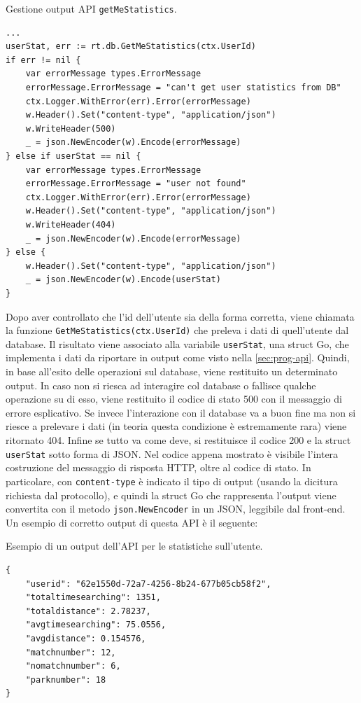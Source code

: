 \documentclass[italian, Lau, oneside, nodefaultfont, noexaminfo]{sapthesis}
\begin{document}
\begin{listing}[H]
\caption{Gestione output API \texttt{getMeStatistics}.}
\begin{verbatim}
...
userStat, err := rt.db.GetMeStatistics(ctx.UserId)
if err != nil {
	var errorMessage types.ErrorMessage
	errorMessage.ErrorMessage = "can't get user statistics from DB"
	ctx.Logger.WithError(err).Error(errorMessage)
	w.Header().Set("content-type", "application/json")
	w.WriteHeader(500)
	_ = json.NewEncoder(w).Encode(errorMessage)
} else if userStat == nil {
	var errorMessage types.ErrorMessage
	errorMessage.ErrorMessage = "user not found"
	ctx.Logger.WithError(err).Error(errorMessage)
	w.Header().Set("content-type", "application/json")
	w.WriteHeader(404)
	_ = json.NewEncoder(w).Encode(errorMessage)
} else {
	w.Header().Set("content-type", "application/json")
	_ = json.NewEncoder(w).Encode(userStat)
}
\end{verbatim}
\end{listing}

Dopo aver controllato che l'id dell'utente sia della forma corretta, viene chiamata la funzione \texttt{GetMeStatistics(ctx.UserId)} che  preleva i dati di quell'utente dal database. Il risultato viene associato alla variabile \texttt{userStat}, una struct Go, che implementa i dati da riportare in output come visto nella \autoref{sec:prog-api}.  Quindi, in base all'esito delle operazioni sul database, viene restituito un determinato output. In caso non si riesca ad interagire col database o fallisce qualche operazione su di esso, viene restituito il codice di stato 500 con il messaggio di errore esplicativo. Se invece l'interazione con il database va a buon fine ma non si riesce a prelevare i dati (in teoria questa condizione è estremamente rara) viene ritornato 404. Infine se tutto va come deve, si restituisce il codice 200 e la struct \texttt{userStat} sotto forma di JSON.
Nel codice appena mostrato è visibile l'intera costruzione del messaggio di risposta HTTP, oltre al codice di stato. In particolare, con \texttt{content-type} è indicato il tipo di output (usando la dicitura richiesta dal protocollo), e quindi la struct Go che rappresenta l'output viene convertita con il metodo \texttt{json.NewEncoder}  in un JSON, leggibile dal front-end. Un esempio di corretto output di questa API è il seguente:

\begin{listing}[H]
\caption{Esempio di un output dell'API per le statistiche sull'utente.}
\begin{verbatim}
{
    "userid": "62e1550d-72a7-4256-8b24-677b05cb58f2",
    "totaltimesearching": 1351,
    "totaldistance": 2.78237,
    "avgtimesearching": 75.0556,
    "avgdistance": 0.154576,
    "matchnumber": 12,
    "nomatchnumber": 6,
    "parknumber": 18
}
\end{verbatim}
\end{listing}
\end{document}
